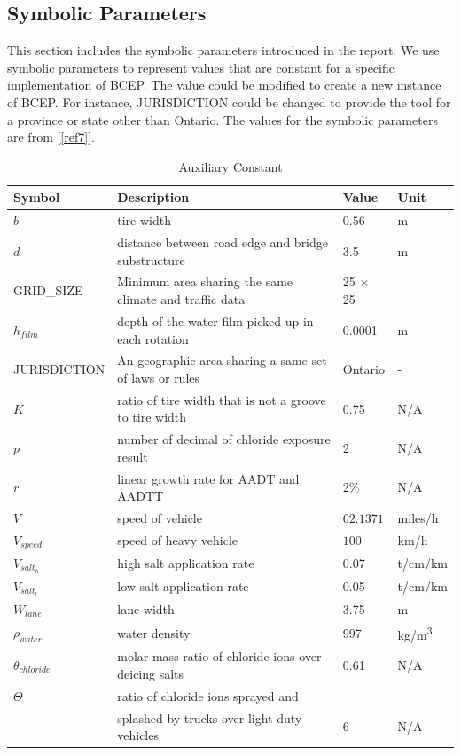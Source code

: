 \documentclass[12pt]{article}
\newcommand{\reref}[1]{\ref{#1}}
\begin{document}
\subsection{Symbolic Parameters}\label{SP}
This section includes the symbolic parameters introduced in the report. We use symbolic parameters to represent values that are constant for a specific implementation of BCEP. The value could be modified to create a new instance of BCEP. For instance, JURISDICTION could be changed to provide the tool for a province or state other than Ontario. The values for the symbolic parameters are from [\reref{ref7}].

\begin{table}[!h]

  \renewcommand{\arraystretch}{1.2}
\noindent \begin{longtable*}{l l l l} 
  \toprule
 \textbf{Symbol} & \textbf{Description} & \textbf{Value} & \textbf{Unit}\\


  \midrule 
  $b$ & tire width & $0.56$ & m   \\
  $d$ & distance between road edge and bridge substructure & 3.5 & m
  \\
  
  GRID\_SIZE & Minimum area sharing the same climate and traffic data & 25 $\times$ 25 & - \\
  $h_{film}$ & depth of the water film picked up in each rotation & 0.0001 & m
  \\
  JURISDICTION & An geographic area sharing a same set of laws or rules & Ontario & - \\
  $K$ & ratio of tire width that is not a groove to tire width & 0.75& N/A
  \\
  $p$ & number of decimal of chloride exposure result & 2 & N/A \\
  $r$ & linear growth rate for AADT and AADTT & 2\% & N/A\\
 
  $V$ &  speed of vehicle & $62.1371$ & miles/h   \\
  $V_{speed}$ & speed of heavy vehicle & $100$ & km/h   \\
  $V_{salt_{h}}$ & high salt application rate & 0.07 & t/cm/km \\
  $V_{salt_{l}}$ & low salt application rate & 0.05 & t/cm/km
  \\
  $W_{lane}$ & lane width & 3.75 & m
  \\  
  $\rho_{water}$ & water density & 997 & \si{kg/m^3}
  \\  
  $\theta_{chloride}$ &  molar mass ratio of chloride ions over deicing salts & 0.61 & N/A \\
  $\Theta$ & ratio of chloride ions sprayed and  \\
  & splashed by trucks over light-duty vehicles& 6 & N/A  \\  

  \bottomrule
\end{longtable*}
  \caption{Auxiliary Constant} \label{TblConstants}
\end{table}
\end{document}
